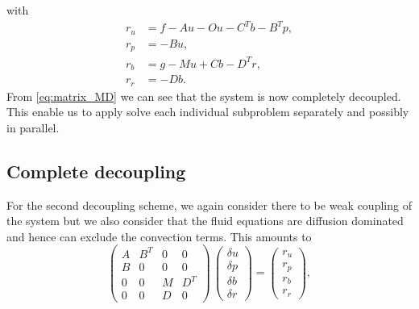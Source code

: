 with
\begin{align*}
r_u &= f- Au -O u - C^T b- B^T p,\\[0.1cm]
r_p &=-B u,\\[0.1cm]
r_b &=g-Mu+Cb-D^T r,\\[0.1cm]
r_r &=-D b.
\end{align*}
From \eqref{eq:matrix_MD} we can see that the system is now completely decoupled. This enable us to apply solve each individual subproblem separately and possibly in parallel.

\subsection{Complete decoupling}


For the second decoupling scheme, we again consider there to be weak coupling of the system but we also consider that the fluid equations are diffusion dominated and hence can exclude the convection terms.
This amounts to
\begin{equation}
\label{eq:matrix_CD}
\left(
\begin{array}{cccc}
A & B^T & 0 & 0\\
B & 0 & 0 & 0 \\
0 & 0 & M & D^T\\
0 & 0 & D & 0
\end{array}
\right)
\,
\left(
\begin{array}{c}
\delta u\\
\delta p\\
\delta b\\
\delta r
\end{array}
\right)  =
\begin{pmatrix}
r_u \\
r_p\\
r_b\\
r_r
\end{pmatrix},
\end{equation}
